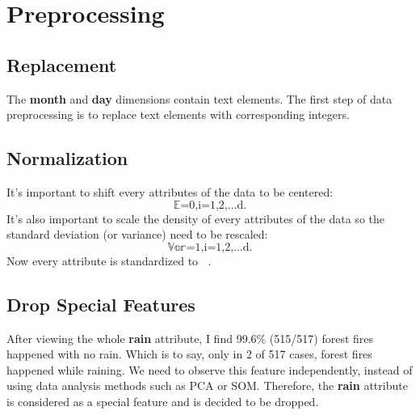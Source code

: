 \documentclass[titlepage,a4paper,12pt,thmsb]{report}
\begin{document}




\newpage
{}
\newpage


\chapter*{Preprocessing}

\section*{Replacement}

The {\bf month} and {\bf day} dimensions contain text elements. The first step of data preprocessing is to replace text elements with corresponding integers.

\section*{Normalization}

It's important to shift every attributes of the data to be centered:
$$\mathop{\mathbb{E}[X_i] = 0, i = 1,2,...d.}$$It's also important to scale the density of every attributes of the data so the standard deviation (or variance) need to be rescaled: $$\mathop{\mathbb{Var}[X_i] = 1, i = 1,2,...d.}$$Now every attribute is standardized to $\mathop{\frac{X_i - \mu}{\sigma}}$.

\section*{Drop Special Features}

After viewing the whole {\bf rain} attribute, I find 99.6\% (515/517) forest fires happened with no rain. Which is to say, only in 2 of 517 cases, forest fires happened while raining. We need to observe this feature independently, instead of using data analysis methods such as PCA or SOM. Therefore, the {\bf rain} attribute is considered as a special feature and is decided to be dropped.
\end{document}
